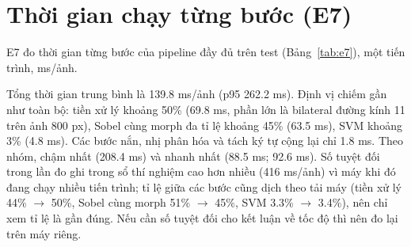 \section{Thời gian chạy từng bước (E7)}
\label{sec:e7}

E7 đo thời gian từng bước của pipeline đầy đủ trên test (Bảng~\ref{tab:e7}), một tiến trình, ms/ảnh.



Tổng thời gian trung bình là 139.8 ms/ảnh (p95 262.2 ms). Định vị chiếm gần như toàn bộ: tiền xử lý khoảng 50\% (69.8 ms, phần lớn là bilateral đường kính 11 trên ảnh 800 px), Sobel cùng morph đa tỉ lệ khoảng 45\% (63.5 ms), SVM khoảng 3\% (4.8 ms). Các bước nắn, nhị phân hóa và tách ký tự cộng lại chỉ 1.8 ms. Theo nhóm,  chậm nhất (208.4 ms) và  nhanh nhất (88.5 ms;  92.6 ms). Số tuyệt đối trong lần đo ghi trong sổ thí nghiệm cao hơn nhiều (416 ms/ảnh) vì máy khi đó đang chạy nhiều tiến trình; tỉ lệ giữa các bước cũng dịch theo tải máy (tiền xử lý 44\% $\to$ 50\%, Sobel cùng morph 51\% $\to$ 45\%, SVM 3.3\% $\to$ 3.4\%), nên chỉ xem tỉ lệ là gần đúng. Nếu cần số tuyệt đối cho kết luận về tốc độ thì nên đo lại trên máy riêng.
